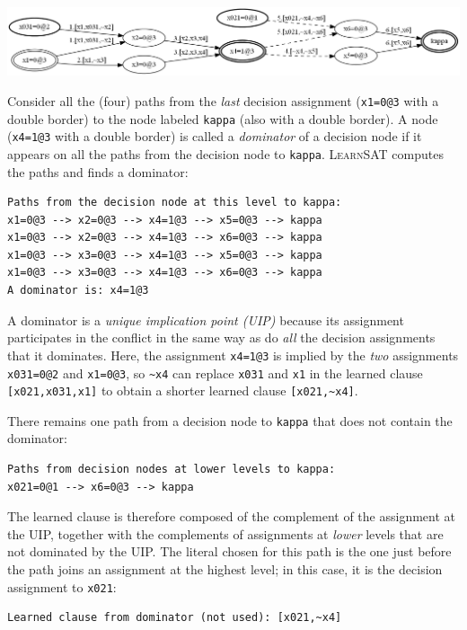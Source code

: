 \documentclass[11pt]{report}
\newcommand*{\p}[1]{\textup{\texttt{#1}}}
\newcommand*{\ls}{\textsc{LearnSAT}}
\begin{document}
\begin{center}
\includegraphics[keepaspectratio=true,width=\textwidth]{dom-bw}
\end{center}

Consider all the (four) paths from the \emph{last} decision assignment
(\p{x1=0@3} with a double border) to the node labeled \p{kappa} (also
with a double border). A node (\p{x4=1@3} with a double border) is
called a \emph{dominator} of a decision node if it appears on all the
paths from the decision node to \p{kappa}. \ls{} computes the paths and
finds a dominator:

\begin{verbatim}
Paths from the decision node at this level to kappa:
x1=0@3 --> x2=0@3 --> x4=1@3 --> x5=0@3 --> kappa
x1=0@3 --> x2=0@3 --> x4=1@3 --> x6=0@3 --> kappa
x1=0@3 --> x3=0@3 --> x4=1@3 --> x5=0@3 --> kappa
x1=0@3 --> x3=0@3 --> x4=1@3 --> x6=0@3 --> kappa
A dominator is: x4=1@3
\end{verbatim}

A dominator is a \emph{unique implication point (UIP)} because its
assignment participates in the conflict in the same way as do \emph{all}
the decision assignments that it dominates. Here, the assignment
\p{x4=1@3} is implied by the \emph{two} assignments \p{x031=0@2} and
\p{x1=0@3}, so \verb+~x4+ can replace \p{x031} and \p{x1} in the learned
clause \verb+[x021,x031,x1]+ to obtain a shorter learned clause
\verb+[x021,~x4]+.

There remains one path from a decision node to \p{kappa} that does not
contain the dominator:
\begin{verbatim}
Paths from decision nodes at lower levels to kappa:
x021=0@1 --> x6=0@3 --> kappa
\end{verbatim}

The learned clause is therefore composed of the complement of the
assignment at the UIP, together with the complements of assignments at
\emph{lower} levels that are not dominated by the UIP. The literal
chosen for this path is the one just before the path joins an assignment
at the highest level; in this case, it is the decision assignment to
\verb+x021+:

\begin{verbatim}
Learned clause from dominator (not used): [x021,~x4]
\end{verbatim}
\end{document}
